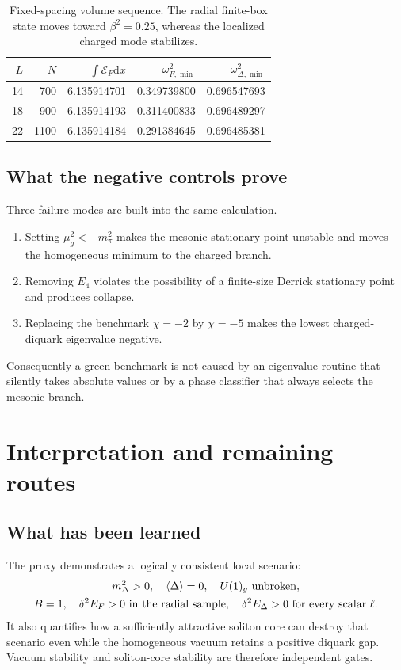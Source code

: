 \documentclass[11pt]{article}
\theoremstyle{definition}
\theoremstyle{remark}
\newcommand{\dd}{\mathrm d}
\newcommand{\cE}{\mathcal E}
\begin{document}
\begin{table}[htbp]
\centering
\begin{tabular}{@{}rrrrr@{}}
\toprule
\(L\) & \(N\) & \(\int\cE_F\dd x\) &
\(\omega_{F,\min}^2\) & \(\omega_{\Delta,\min}^2\)\\
\midrule
14 & 700  & 6.135914701 & 0.349739800 & 0.696547693\\
18 & 900  & 6.135914193 & 0.311400833 & 0.696489297\\
22 & 1100 & 6.135914184 & 0.291384645 & 0.696485381\\
\bottomrule
\end{tabular}
\caption{Fixed-spacing volume sequence.  The radial finite-box state moves
toward \(\beta^2=0.25\), whereas the localized charged mode stabilizes.}
\label{tab:volume-convergence}
\end{table}

\subsection{What the negative controls prove}

Three failure modes are built into the same calculation.
\begin{enumerate}
\item Setting \(\mu_g^2<-m_\pi^2\) makes the mesonic stationary point
  unstable and moves the homogeneous minimum to the charged branch.
\item Removing \(E_4\) violates the possibility of a finite-size Derrick
  stationary point and produces collapse.
\item Replacing the benchmark \(\chi=-2\) by \(\chi=-5\) makes the lowest
  charged-diquark eigenvalue negative.
\end{enumerate}
Consequently a green benchmark is not caused by an eigenvalue routine that
silently takes absolute values or by a phase classifier that always selects
the mesonic branch.

\section{Interpretation and remaining routes}

\subsection{What has been learned}

The proxy demonstrates a logically consistent local scenario:
\begin{equation}
\begin{gathered}
 m_\Delta^2>0,\quad \langle\Delta\rangle=0,\quad
 U(1)_g\ {\rm unbroken},\\
 B=1,\quad \delta^2E_F>0\ {\rm in\ the\ radial\ sample},\quad
 \delta^2E_\Delta>0\ {\rm for\ every\ scalar}\ \ell .
\end{gathered}
\end{equation}
It also quantifies how a sufficiently attractive soliton core can destroy
that scenario even while the homogeneous vacuum retains a positive diquark
gap.  Vacuum stability and soliton-core stability are therefore independent
gates.
\end{document}
